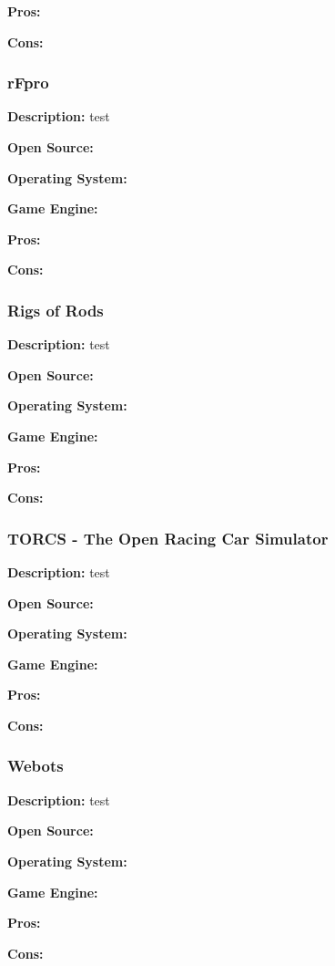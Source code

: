 \textbf{Pros:}

\textbf{Cons:}


\subsubsection{rFpro}
\textbf{Description:} test

\textbf{Open Source:}

\textbf{Operating System:}

\textbf{Game Engine:}

\textbf{Pros:}

\textbf{Cons:}

\subsubsection{Rigs of Rods}
\textbf{Description:} test

\textbf{Open Source:}

\textbf{Operating System:}

\textbf{Game Engine:}

\textbf{Pros:}

\textbf{Cons:}

\subsubsection{TORCS - The Open Racing Car Simulator}
\textbf{Description:} test

\textbf{Open Source:}

\textbf{Operating System:}

\textbf{Game Engine:}

\textbf{Pros:}

\textbf{Cons:}

\subsubsection{Webots}
\textbf{Description:} test

\textbf{Open Source:}

\textbf{Operating System:}

\textbf{Game Engine:}

\textbf{Pros:}

\textbf{Cons:}